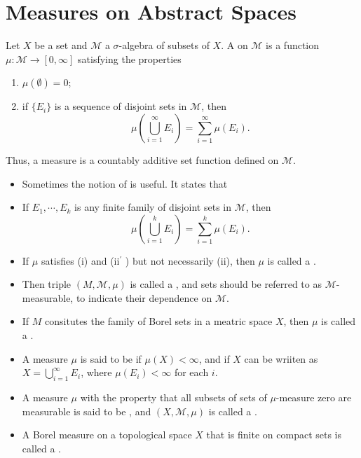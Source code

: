 \documentclass[../main.tex]{subfiles}
\begin{document}
\section{Measures on Abstract Spaces}

\begin{definition}{}{}
Let $X$ be a set and $\mathcal{M}$ a $\sigma$-algebra of subsets of $X$. A  on $\mathcal{M}$ is a function $\mu: \mathcal{M} \to [0, \infty]$ satisfying the properties
\begin{enumerate}
\item[(i)] $\mu(\emptyset) = 0$;
\item[(ii)] if $\{E_i\}$ is a sequence of disjoint sets in $\mathcal{M}$, then
\[ \mu\left(\bigcup_{i=1}^{\infty} E_i\right) = \sum_{i=1}^{\infty} \mu(E_i). \]
\end{enumerate}
Thus, a measure is a countably additive set function defined on $\mathcal{M}$.

\begin{itemize}
    \item  Sometimes the notion of  is useful. It states that 
    \item[(ii)\(  ^{\prime}   \) ] If \(   E_1,\cdots,E_k   \) is any finite family of disjoint sets in \(  \mathcal{M}  \), then \[
    \mu \left( \bigcup _{i= 1}^{k}E_{i} \right)= \sum _{i= 1}^{k}\mu \left( E_{i} \right).   
    \]  
    \item If \(  \mu   \) satisfies (i) and (ii\(  ^{\prime}   \) ) but not necessarily (ii), then \(  \mu   \) is called a . 
    \item Then triple \( \left(  M,\mathcal{M},\mu  \right)   \)    is called a , and sets should be referred to as \(  \mathcal{M}  \)-measurable, to indicate their dependence on \(  \mathcal{M}  \).  
    \item If \(  M  \) consitutes the family of Borel sets in a meatric space \(  X  \), then \(  \mu   \) is called a . 
    \item A measure \(  \mu   \) is said to be  if \(  \mu \left( X \right)< \infty   \), and  if \(  X  \) can be wriiten as \(  X= \bigcup _{i= 1}^{\infty}E_{i}  \), where \(  \mu \left( E_{i} \right)< \infty   \) for each \(  i  \).
    \item A measure \(  \mu   \) with the property that all subsets of sets of \(  \mu   \)-measure zero are measurable is said to be , and \(  \left( X,\mathcal{M},\mu  \right)   \) is called a . 
    \item A Borel measure on a topological space \(  X  \) that is finite on compact sets is called a .             
\end{itemize}

\end{definition}
\end{document}
